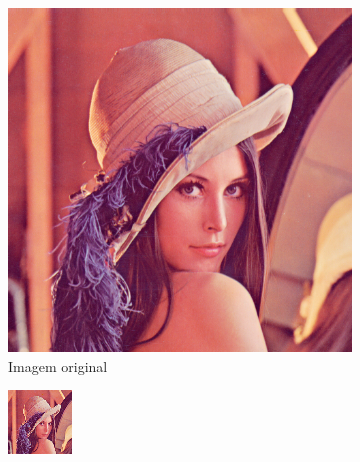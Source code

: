\documentclass[12pt, a4paper]{article}
\begin{document}
    \begin{figure}[h]
        \begin{subfigure}{.3\textwidth}
            \includegraphics[width=.95\textwidth]{../lenacrop.png}
            \caption{Imagem original}
        \end{subfigure}
        \begin{subfigure}{.3\textwidth}
            \includegraphics[width=.95\textwidth]{../lenacomp7.png}

\end{subfigure}
\end{figure}
\end{document}
